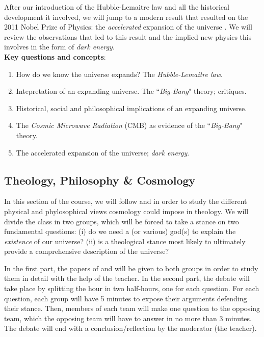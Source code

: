 \documentclass{tufte-handout}
\begin{document}
\begin{fullwidth}
After our introduction of the Hubble-Lemaitre law and all the historical development it involved, we will jump to a modern result that 
resulted on the 2011 Nobel Prize of Physics: the \textit{accelerated} expansion of the universe \citep{AEU}. We will review the observations 
that led to this result and the implied new physics this involves in the form of \textit{dark energy}.\\
\vspace{0.5 cm}
\noindent\textbf{Key questions and concepts}:
\begin{enumerate}
\item How do we know the universe expands? The \textit{Hubble-Lemaitre law}.
\item Intepretation of an expanding universe. The ``\textit{Big-Bang}" theory; critiques.
\item Historical, social and philosophical implications of an expanding universe.
\item The \textit{Cosmic Microwave Radiation} (CMB) as evidence of the ``\textit{Big-Bang}" theory.
\item The accelerated expansion of the universe; \textit{dark energy}.
\end{enumerate}

\subsection{\textbf{Theology, Philosophy \& Cosmology}}
In this section of the course, we will follow \citet{theo:2017} and \citet{theo:2005} in order to study the different physical and 
phylosophical views cosmology could impose in theology. We will divide the class in two groups, which will be forced to take a stance 
on two fundamental questions: (i) do we need a (or various) god(s) to explain the \textit{existence} of our universe? (ii) is a theological 
stance most likely to ultimately provide a comprehensive description of the universe?

In the first part, the papers of \citet{theo:2017} and \citet{theo:2005} will be given to both groups in order to study them in detail with the 
help of the teacher. In the second part, the debate will take place by splitting the hour in two half-hours, one for each question. For each question, 
each group will have 5 minutes to expose their arguments defending their stance. Then, members of each team will make one question to the opposing team, 
which the opposing team will have to answer in no more than 3 minutes. The debate will end with a conclusion/reflection by the moderator (the teacher).

\end{fullwidth}
\pagebreak
\end{document}
